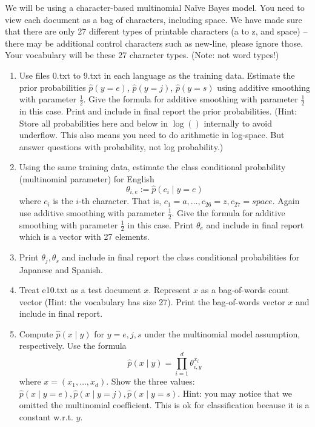 \documentclass[a4paper]{article}
\theoremstyle{definition}
\begin{document}
We will be using a character-based multinomial Naïve Bayes model.  You need to view each document as a bag of characters, including space.  We have made sure that there are only 27 different types of printable characters (a to z, and space) -- there may be additional control characters such as new-line, please ignore those.  Your vocabulary will be these 27 character types. (Note: not word types!)


\begin{enumerate}
\item
Use files 0.txt to 9.txt in each language as the training data.
Estimate the prior probabilities 
$\hat p(y=e)$,
$\hat p(y=j)$,
$\hat p(y=s)$
using additive smoothing with parameter $\frac{1}{2}$. 
Give the formula for additive smoothing with parameter $\frac{1}{2}$ in this case. 
Print and include in final report the prior probabilities.
(Hint: Store all probabilities here and below in $\log()$ internally to avoid underflow. This also means you need to do arithmetic in log-space.  But answer questions with probability, not log probability.)


\item
Using the same training data, estimate the class conditional probability (multinomial parameter) for English
$$\theta_{i,e} := \hat p(c_i \mid y=e)$$ 
where $c_i$ is the $i$-th character. That is, $c_1 = a, \ldots, c_{26} = z, c_{27} = space$.
Again use additive smoothing with parameter $\frac{1}{2}$.
Give the formula for additive smoothing with parameter $\frac{1}{2}$ in this case. 
Print $\theta_e$ and include in final report which is a vector with 27 elements.


\item
Print $\theta_j, \theta_s$ and include in final report the class conditional probabilities for Japanese and Spanish.

\item
Treat e10.txt as a test document $x$.
Represent $x$ as a bag-of-words count vector (Hint: the vocabulary has size 27).
Print the bag-of-words vector $x$ and include in final report.

\item
Compute $\hat p(x \mid y)$ for $y=e, j, s$ under the multinomial model assumption, respectively.
Use the formula
$$\hat p(x \mid y) = \prod_{i=1}^d \theta_{i, y}^{x_i}$$
where $x=(x_1, \ldots, x_d)$.
Show the three values: $\hat p(x \mid y=e), \hat p(x \mid y=j), \hat p(x \mid y=s)$.
Hint: you may notice that we omitted the multinomial coefficient.  This is ok for classification because it is a constant w.r.t. $y$.



\end{enumerate}
\end{document}
